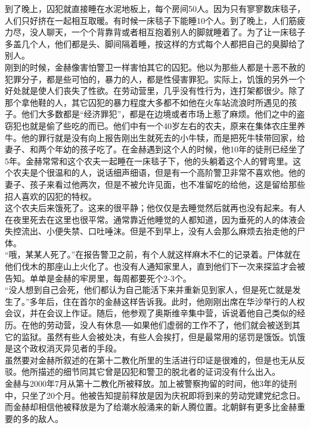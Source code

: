 到了晚上，囚犯就直接睡在水泥地板上，每个房间50人。因为只有寥寥数床毯子，人们只好挤在一起相互取暖。有时候一床毯子下能睡10个人。到了晚上，人们筋疲力尽，没人聊天，一个个背靠背或者相互抱着别人的脚就睡着了。为了让一床毯子多盖几个人，他们都是头、脚间隔着睡，按这样的方式每个人都把自己的臭脚给了别人。\\

刚到的时候，金赫像害怕警卫一样害怕其它的囚犯。他以为那些人都是十恶不赦的犯罪分子，都是些可怕的，暴力的人，都是性侵害罪犯。实际上，饥饿的另外一个好处就是使人们丧失了性欲。在劳动营里，几乎没有性行为，连打架都很少。除了那个拿他鞋的人，其它囚犯的暴力程度大多都不如他在火车站流浪时所遇见的孩子。他们大多数都是“经济罪犯”，都是在边境或者市场上惹了麻烦。他们之中的盗窃犯也就是偷了些吃的而已。他们中有一个40岁左右的农夫，原来在集体农庄里养牛。他的罪行就是没有向上报告刚出生就死去的小牛犊，而是把死牛犊带回家，给妻子、和两个年幼的孩子吃了。在金赫遇到这个人的时候，他10年的徒刑已经坐了5年。金赫常常和这个农夫一起睡在一床毯子下，他的头躺着这个人的臂弯里。这个农夫是个很温和的人，说话细声细语，但是有一个高阶警卫非常不喜欢他。他的妻子、孩子来看过他两次，但是不被允许见面，也不准留吃的给他，这是留给那些招人喜欢的囚犯的特权。\\

这个农夫后来饿死了。这来的很平静；他仅仅是去睡觉然后就再也没有起来。有人在夜里死去在这里也很平常。通常靠近他睡觉的人都知道，因为垂死的人的体液会失控流出、小便失禁、口吐唾沫。但是不到早上，没有人会那么麻烦去抬走他的尸体。\\

“哦，某某人死了。”在报告警卫之前，有个人就这样麻木不仁的记录着。尸体就在他们伐木的那座山上火化了。也没有人通知家里人，直到他们下一次来探监才会被告知。单单是金赫的牢房里，每周都要死个2-3个。\\

“没人想到自己会死，他们都认为自己能活下来并重新见到家人，但是死亡就是发生了。”多年后，住在首尔的金赫这样告诉我。此时，他刚刚出席在华沙举行的人权会议，并在会议上作证。随后，他参观了奥斯维辛集中营，诉说着他自己类似的经历。在他的劳动营，没人有休息──如果他们虚弱的工作不了，他们就会被送到其它的监狱。虽然有些人会被处决，有些人会挨打，但是最常用的惩罚是饿饭。饥饿是这个政权消灭异见者的手段。\\

虽然要对金赫所叙述的在第十二教化所里的生活进行印证是很难的，但是也无从反驳。他所描述的细节同其它曾是囚犯和警卫的脱北者的证词没有什么出入。\\

金赫与2000年7月从第十二教化所被释放。加上被警察拘留的时间，他3年的徒刑中，只坐了20个月。他被告知提前释放是因为庆祝即将到来的劳动党建党纪念日。而金赫却相信他被释放是为了给潮水般涌来的新人腾位置。北朝鲜有更多比金赫重要的多的敌人。\\

